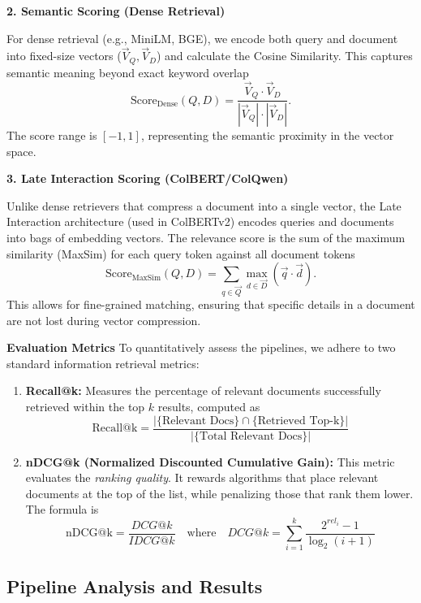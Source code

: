 \textbf{2. Semantic Scoring (Dense Retrieval)}

For dense retrieval (e.g., MiniLM, BGE), we encode both query and document into fixed-size vectors ($\vec{V}_Q, \vec{V}_D$) and calculate the Cosine Similarity. This captures semantic meaning beyond exact keyword overlap
\begin{equation*}
    \text{Score}_{\text{Dense}}(Q, D) = \dfrac{\vec{V}_{Q} \cdot \vec{V}_{D}}{|\vec{V}_{Q}| \cdot |\vec{V}_{D}|}.
\end{equation*}
The score range is $[-1, 1]$, representing the semantic proximity in the vector space.

\textbf{3. Late Interaction Scoring (ColBERT/ColQwen)}

Unlike dense retrievers that compress a document into a single vector, the Late Interaction architecture (used in ColBERTv2) encodes queries and documents into bags of embedding vectors. The relevance score is the sum of the maximum similarity (MaxSim) for each query token against all document tokens
\begin{equation*}
    \text{Score}_{\text{MaxSim}}(Q, D) = \sum_{q \in \vec{Q}} \max_{d \in \vec{D}} (\vec{q} \cdot \vec{d}).
\end{equation*}
This allows for fine-grained matching, ensuring that specific details in a document are not lost during vector compression.

\textbf{Evaluation Metrics}
To quantitatively assess the pipelines, we adhere to two standard information retrieval metrics:

\begin{enumerate}
    \item \textbf{Recall@k:} Measures the percentage of relevant documents successfully retrieved within the top $k$ results, computed as
    \[
    \text{Recall@k} = \dfrac{| \{ \text{Relevant Docs} \} \cap \{ \text{Retrieved Top-k} \} |}{| \{ \text{Total Relevant Docs} \} |}
    \]
    \item \textbf{nDCG@k (Normalized Discounted Cumulative Gain):} This metric evaluates the \textit{ranking quality}. It rewards algorithms that place relevant documents at the top of the list, while penalizing those that rank them lower. The formula is
    \[
    \text{nDCG@k} = \dfrac{DCG@k}{IDCG@k} \quad \text{where} \quad DCG@k = \sum_{i=1}^{k} \dfrac{2^{rel_i} - 1}{\log_2(i+1)}
    \]
\end{enumerate}

\subsection{Pipeline Analysis and Results}

